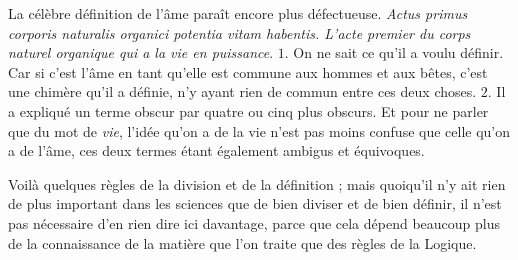 La célèbre définition de l'âme paraît encore plus défectueuse. \emph{Actus primus corporis naturalis organici potentia vitam habentis. L'acte premier du corps naturel organique qui a la vie en puissance}. $1$. On ne sait ce qu'il a voulu définir. Car si c'est l'âme en tant qu'elle est commune aux hommes et aux bêtes, c'est une chimère qu'il a définie, n'y ayant rien de commun entre ces deux choses. $2$. Il a expliqué un terme obscur par quatre ou cinq plus obscurs. Et pour ne parler que du mot de \emph{vie}, l'idée qu'on a de la vie n'est pas moins confuse que celle qu'on a de l'âme, ces deux termes étant également ambigus et équivoques.

\bigbreak
Voilà quelques règles de la division et de la définition ; mais quoiqu'il n'y ait rien de plus important dans les sciences que de bien diviser et de bien définir, il n'est pas nécessaire d'en rien dire ici davantage, parce que cela dépend beaucoup plus de la connaissance de la matière que l'on traite que des règles de la Logique.
